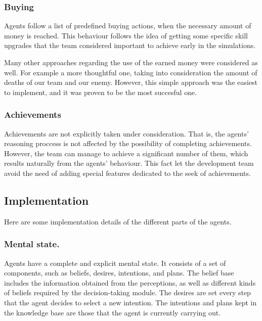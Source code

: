 \documentclass{llncs2e/llncs}
\begin{document}
\subsubsection{Buying}

    Agents follow a list of predefined buying actions, when the necessary amount 
    of money is reached. This behaviour follows the idea of getting some specific skill 
    upgrades that the team considered important to achieve early in the simulations.
    
    Many other approaches regarding the use of the earned money were considered as well.
    For example a more thoughtful one, taking into consideration the amount of deaths 
    of our team and our enemy. However, this simple approach was the easiest to implement, 
    and it was proven to be the most succesful one.

\subsubsection{Achievements}

    Achievements are not explicitly taken under consideration. That is, the agents'
    reasoning proccess is not affected by the possibility of completing achievements.    
    However, the team can manage to achieve a significant number of them, which 
    results naturally from the agents' behaviour. 
    This fact let the development team avoid the need of adding special features 
    dedicated to the seek of achievements.
    
\subsection{Implementation}

    Here are some implementation details of the different parts of the agents.
    
\subsubsection{Mental state.}

    Agents have a complete and explicit mental state. It consists of a set of 
    components, such as beliefs, desires, intentions, and plans. 
    The belief base includes the information obtained from the perceptions, as
    well as different kinds of beliefs required by the decision-taking module.
    The desires are set every step that the agent decides to select a new intention.
    The intentions and plans kept in the knowledge base are those that the agent
    is currently carrying out.
    
\end{document}
